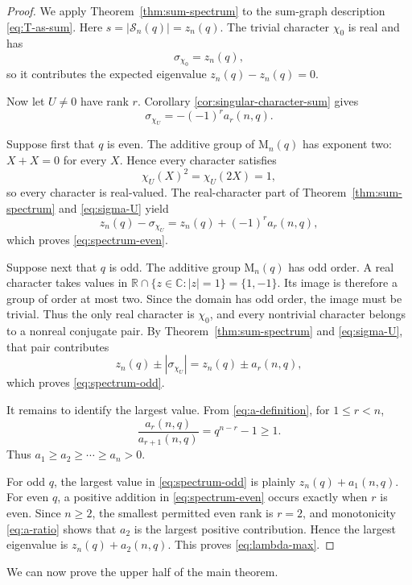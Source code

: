 \documentclass[11pt]{article}
\theoremstyle{definition}
\newcommand{\Mat}{\mathrm{M}}
\newcommand{\cS}{\mathcal{S}}
\begin{document}
\begin{proof}
We apply Theorem~\ref{thm:sum-spectrum} to the sum-graph description \eqref{eq:T-as-sum}.  Here $s=|\cS_n(q)|=z_n(q)$.  The trivial character $\chi_0$ is real and has
\[
  \sigma_{\chi_0}=z_n(q),
\]
so it contributes the expected eigenvalue $z_n(q)-z_n(q)=0$.

Now let $U\ne0$ have rank $r$.  Corollary \ref{cor:singular-character-sum} gives
\begin{equation}\label{eq:sigma-U}
  \sigma_{\chi_U}=-(-1)^r a_r(n,q).
\end{equation}

Suppose first that $q$ is even.  The additive group of $\Mat_n(q)$ has exponent two: $X+X=0$ for every $X$.  Hence every character satisfies
\[
  \chi_U(X)^2=\chi_U(2X)=1,
\]
so every character is real-valued.  The real-character part of
Theorem~\ref{thm:sum-spectrum} and \eqref{eq:sigma-U} yield
\[
  z_n(q)-\sigma_{\chi_U}
  =z_n(q)+(-1)^r a_r(n,q),
\]
which proves \eqref{eq:spectrum-even}.

Suppose next that $q$ is odd.  The additive group $\Mat_n(q)$ has odd order.  A real character takes values in $\mathbb R\cap\{z\in\mathbb C:|z|=1\}=\{1,-1\}$.  Its image is therefore a group of order at most two.  Since the domain has odd order, the image must be trivial.  Thus the only real character is $\chi_0$, and every nontrivial character belongs to a nonreal conjugate pair.  By Theorem~\ref{thm:sum-spectrum} and \eqref{eq:sigma-U}, that pair contributes
\[
  z_n(q)\pm|\sigma_{\chi_U}|
  =z_n(q)\pm a_r(n,q),
\]
which proves \eqref{eq:spectrum-odd}.

It remains to identify the largest value.  From \eqref{eq:a-definition}, for $1\le r<n$,
\begin{equation}\label{eq:a-ratio}
  \frac{a_r(n,q)}{a_{r+1}(n,q)}=q^{n-r}-1\ge1.
\end{equation}
Thus $a_1\ge a_2\ge\cdots\ge a_n>0$.

For odd $q$, the largest value in \eqref{eq:spectrum-odd} is plainly $z_n(q)+a_1(n,q)$.  For even $q$, a positive addition in \eqref{eq:spectrum-even} occurs exactly when $r$ is even.  Since $n\ge2$, the smallest permitted even rank is $r=2$, and monotonicity
\eqref{eq:a-ratio} shows that $a_2$ is the largest positive contribution. Hence the largest eigenvalue is $z_n(q)+a_2(n,q)$.  This proves \eqref{eq:lambda-max}.
\end{proof}

We can now prove the upper half of the main theorem.
\end{document}

